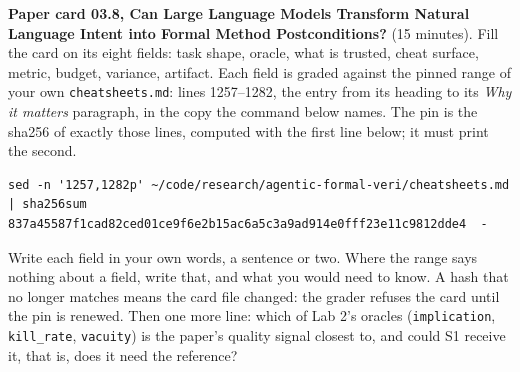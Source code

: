 \documentclass[11pt]{article}
\begin{document}
\begin{problem}\label{prob:B5}
\textbf{Paper card 03.8, Can Large Language Models Transform Natural Language Intent into Formal Method Postconditions?} (15 minutes). Fill the card on its eight
fields: task shape, oracle, what is trusted, cheat surface, metric, budget,
variance, artifact. Each field is graded against the pinned range of your own
\texttt{cheatsheets.md}: lines 1257--1282, the entry from its heading to its
\emph{Why it matters} paragraph, in the copy the command below names. The pin
is the sha256 of exactly those lines, computed with the first line below; it
must print the second.
{\small
\begin{verbatim}
sed -n '1257,1282p' ~/code/research/agentic-formal-veri/cheatsheets.md | sha256sum
837a45587f1cad82ced01ce9f6e2b15ac6a5c3a9ad914e0fff23e11c9812dde4  -
\end{verbatim}
}
Write each field in your own words, a sentence or two. Where the range says
nothing about a field, write that, and what you would need to know. A hash
that no longer matches means the card file changed: the grader refuses the
card until the pin is renewed. Then one more line: which of Lab 2's oracles
(\texttt{implication}, \texttt{kill\_rate}, \texttt{vacuity}) is the paper's
quality signal closest to, and could S1 receive it, that is, does it need the
reference?
\end{problem}
\end{document}
